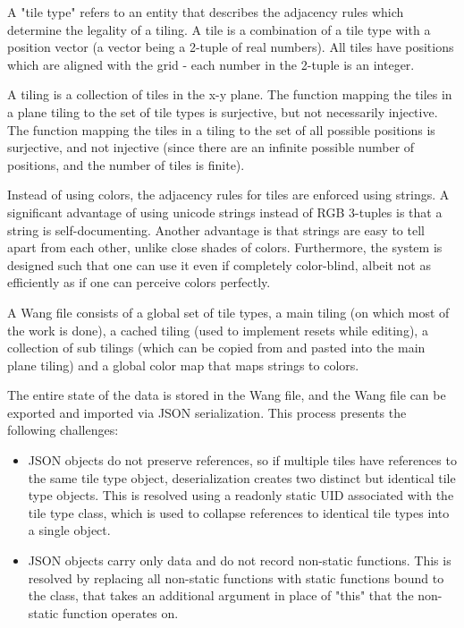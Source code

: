 \documentclass[letterpaper,11pt]{article}
\begin{document}
A "tile type" refers to an entity that describes the adjacency rules which determine the legality of a tiling. A tile is a combination of a tile type with a position vector (a vector being a 2-tuple of real numbers). All tiles have positions which are aligned with the grid - each number in the 2-tuple is an integer.

A tiling is a collection of tiles in the x-y plane. The function mapping the tiles in a plane tiling to the set of tile types is surjective, but not necessarily injective. The function mapping the tiles in a tiling to the set of all possible positions is surjective, and not injective (since there are an infinite possible number of positions, and the number of tiles is finite).


Instead of using colors, the adjacency rules for tiles are enforced using strings. A significant advantage of using unicode strings instead of RGB 3-tuples is that a string is self-documenting. Another advantage is that strings are easy to tell apart from each other, unlike close shades of colors. Furthermore, the system is designed such that one can use it even if completely color-blind, albeit not as efficiently as if one can perceive colors perfectly.

A Wang file consists of a global set of tile types, a main tiling (on which most of the work is done), a cached tiling (used to implement resets while editing), a collection of sub tilings (which can be copied from and pasted into the main plane tiling) and a global color map that maps strings to colors. 

The entire state of the data is stored in the Wang file, and the Wang file can be exported and imported via JSON serialization. This process presents the following challenges:


\begin{itemize}
	\item JSON objects do not preserve references, so if multiple tiles have references to the same tile type object, deserialization creates two distinct but identical tile type objects. This is resolved using a readonly static UID associated with the tile type class, which is used to collapse references to identical tile types into a single object. 
	\item JSON objects carry only data and do not record non-static functions. This is resolved by replacing all non-static functions with static functions bound to the class, that takes an additional argument in place of "this" that the non-static function operates on.
	
\end{itemize}
\end{document}
